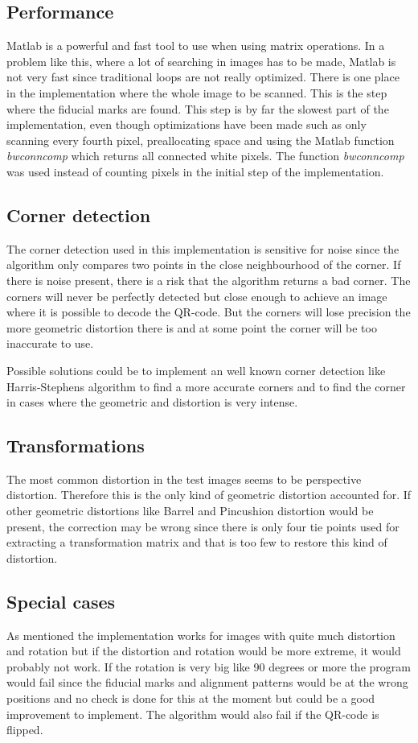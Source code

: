 \documentclass[12pt,a4paper]{article}
\begin{document}
\subsection{Performance}
Matlab is a powerful and fast tool to use when using matrix operations. In a problem like this, where a lot of searching in images has to be made, Matlab is not very fast since traditional loops are not really optimized. There is one place in the implementation where the whole image to be scanned. This is the step where the fiducial marks are found. This step is by far the slowest part of the implementation, even though optimizations have been made such as only scanning every fourth pixel, preallocating space and using the Matlab function \textit{bwconncomp} which returns all connected white pixels. The function \textit{bwconncomp} was used instead of counting pixels in the initial step of the implementation. 

\subsection{Corner detection}
The corner detection used in this implementation is sensitive for noise since the algorithm only compares two points in the close neighbourhood of the corner. If there is noise present, there is a risk that the algorithm returns a bad corner. The corners will never be perfectly detected but close enough to achieve an image where it is possible to decode the QR-code. But the corners will lose precision the more geometric distortion there is and at some point the corner will be too inaccurate to use.

Possible solutions could be to implement an well known corner detection like Harris-Stephens algorithm to find a more accurate corners and to find the corner in cases where the geometric and distortion is very intense.

\subsection{Transformations}
The most common distortion in the test images seems to be perspective distortion. Therefore this is the only kind of geometric distortion accounted for. If other geometric distortions like Barrel and Pincushion distortion would be present, the correction may be wrong since there is only four tie points used for extracting a transformation matrix and that is too few to restore this kind of distortion. 

\subsection{Special cases}
As mentioned the implementation works for images with quite much distortion and rotation but if the distortion and rotation would be more extreme, it would probably not work. If the rotation is very big like 90 degrees or more the program would fail since the fiducial marks and alignment patterns would be at the wrong positions and no check is done for this at the moment but could be a good improvement to implement. The algorithm would also fail if the QR-code is flipped.
\end{document}

